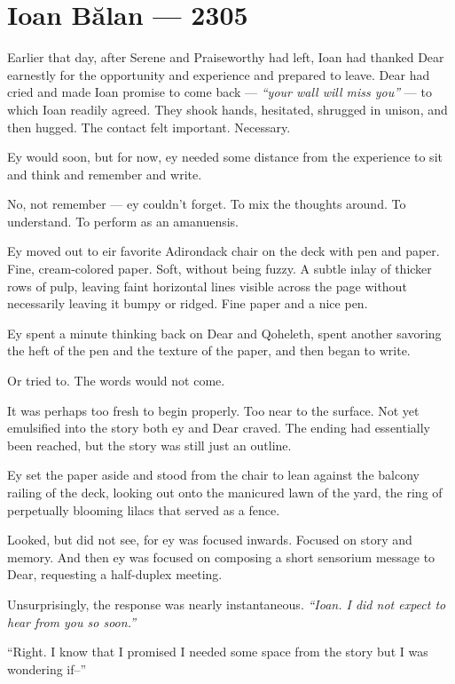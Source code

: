 \hypertarget{ioan-bux103lan-2305}{%
\chapter*{Ioan Bălan — 2305}\label{ioan-bux103lan-2305}}

Earlier that day, after Serene and Praiseworthy had left, Ioan had thanked Dear earnestly for the opportunity and experience and prepared to leave. Dear had cried and made Ioan promise to come back — \emph{``your wall will miss you''} — to which Ioan readily agreed. They shook hands, hesitated, shrugged in unison, and then hugged. The contact felt important. Necessary.

Ey would soon, but for now, ey needed some distance from the experience to sit and think and remember and write.

No, not remember — ey couldn't forget. To mix the thoughts around. To understand. To perform as an amanuensis.

Ey moved out to eir favorite Adirondack chair on the deck with pen and paper. Fine, cream-colored paper. Soft, without being fuzzy. A subtle inlay of thicker rows of pulp, leaving faint horizontal lines visible across the page without necessarily leaving it bumpy or ridged. Fine paper and a nice pen.

Ey spent a minute thinking back on Dear and Qoheleth, spent another savoring the heft of the pen and the texture of the paper, and then began to write.

Or tried to. The words would not come.

It was perhaps too fresh to begin properly. Too near to the surface. Not yet emulsified into the story both ey and Dear craved. The ending had essentially been reached, but the story was still just an outline.

Ey set the paper aside and stood from the chair to lean against the balcony railing of the deck, looking out onto the manicured lawn of the yard, the ring of perpetually blooming lilacs that served as a fence.

Looked, but did not see, for ey was focused inwards. Focused on story and memory. And then ey was focused on composing a short sensorium message to Dear, requesting a half-duplex meeting.

Unsurprisingly, the response was nearly instantaneous. \emph{``Ioan. I did not expect to hear from you so soon.''}

``Right. I know that I promised I needed some space from the story but I was wondering if--''

